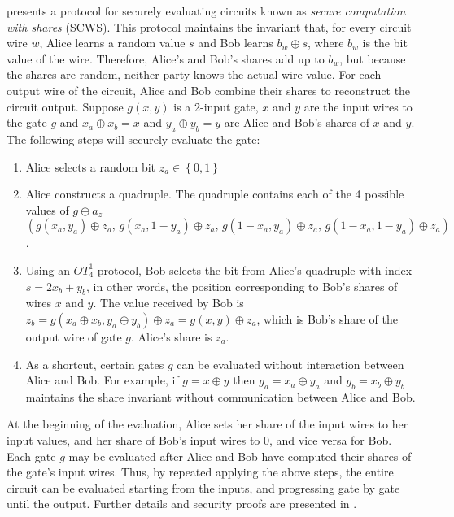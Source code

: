 \cite{GMW87} presents a protocol for securely evaluating circuits
known as \emph{secure computation with shares} (SCWS). This protocol
maintains the invariant that, for every circuit wire $w$, Alice learns
a random value $s$ and Bob learns $b_{w}\oplus s$, where $b_{w}$
is the bit value of the wire. Therefore, Alice's and Bob's shares
add up to $b_{w}$, but because the shares are random, neither party
knows the actual wire value. For each output wire of the circuit,
Alice and Bob combine their shares to reconstruct the circuit output.
Suppose $g(x,y)$ is a 2-input gate, $x$ and $y$ are the input wires
to the gate $g$ and $x_{a}\oplus x_{b}=x$ and $y_{a}\oplus y_{b}=y$
are Alice and Bob's shares of $x$ and $y$. The following steps will
securely evaluate the gate: 
\begin{enumerate}
\item Alice selects a random bit $z_{a}\in\left\{ 0,1\right\} $ 
\item Alice constructs a quadruple. The quadruple contains each of the 4
possible values of $g\oplus a_{z}$\\
$\left(g(x_{a},y_{a})\oplus z_{a},\, g(x_{a},1-y_{a})\oplus z_{a},\, g(1-x_{a},y_{a})\oplus z_{a},\, g(1-x_{a},1-y_{a})\oplus z_{a}\right)$. 
\item Using an $OT_{4}^{1}$ protocol, Bob selects the bit from Alice's
quadruple with index $s=2x_{b}+y_{b}$, in other words, the position
corresponding to Bob's shares of wires $x$ and $y$. The value received
by Bob is $z_{b}=g(x_{a}\oplus x_{b},y_{a}\oplus y_{b})\oplus z_{a}=g(x,y)\oplus z_{a}$,
which is Bob's share of the output wire of gate $g$. Alice's share
is $z_{a}$.
\item As a shortcut, certain gates $g$ can be evaluated without interaction
between Alice and Bob. For example, if $g=x\oplus y$ then $g_{a}=x_{a}\oplus y_{a}$
and $g_{b}=x_{b}\oplus y_{b}$ maintains the share invariant without
communication between Alice and Bob.
\end{enumerate}
At the beginning of the evaluation, Alice sets her share of the input
wires to her input values, and her share of Bob's input wires to $0$,
and vice versa for Bob. Each gate $g$ may be evaluated after Alice
and Bob have computed their shares of the gate's input wires. Thus,
by repeated applying the above steps, the entire circuit can be evaluated
starting from the inputs, and progressing gate by gate until the output.
Further details and security proofs are presented in \cite{Goldreich:vol2}.

